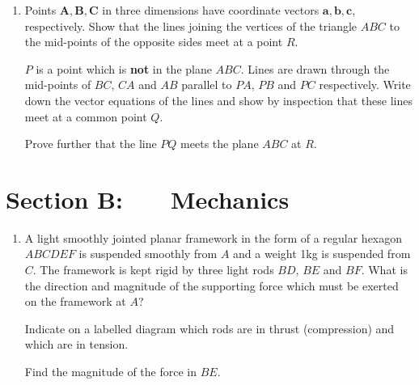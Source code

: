 \documentclass[a4, 11pt]{report}
\newlength{\qspace}
\newcounter{qnumber}
\newenvironment{question}%
 {\vspace{\qspace}
  \begin{enumerate}[\bfseries 1\quad][10]%
    \setcounter{enumi}{\value{qnumber}}%
    \item%
 }
{
  \end{enumerate}
  \filbreak
  \stepcounter{qnumber}
 }
\begin{document}
\begin{question}	
Points $\mathbf{A},\mathbf{B},\mathbf{C}$ in three dimensions have coordinate vectors
$\mathbf{a},\mathbf{b},\mathbf{c}$, respectively. Show that the lines joining the vertices of the
triangle $ABC$ to the mid-points of the opposite sides meet at a point $R$.

$P$ is a point which is {\bf not} in the plane $ABC$.
Lines are drawn through the mid-points of $BC$, $CA$ and $AB$ parallel to
$PA$, $PB$ and $PC$ respectively. Write down the vector equations of the
lines and show by inspection that these lines
meet at a common point $Q$.

Prove further that the line $PQ$ meets the plane $ABC$ at $R$.
\end{question}	
		

		
	
\newpage
\section*{Section B: \ \ \ Mechanics}


	
\begin{question}
A light smoothly jointed planar framework in the form of a regular hexagon
$ABCDEF$ is
suspended smoothly from $A$ and a weight 1kg is suspended from $C$. 
The framework is kept rigid by three light
rods $BD$, $BE$ and $BF$.
What is the 
direction and magnitude of the supporting force which must be exerted on the
framework at $A$?

Indicate on a labelled
diagram which rods are in thrust (compression) and which are in tension.

Find the magnitude of the force in $BE$.
	\end{question}
	
\end{document}
